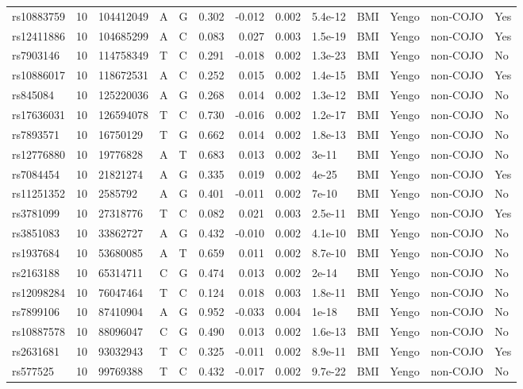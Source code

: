 \documentclass[11pt,twoside]{bristolthesis}
\begin{document}
\begin{longtable}[t]{lrlllrrrlllll}
rs10883759 & 10 & 104412049 & A & G & 0.302 & -0.012 & 0.002 & 5.4e-12 & BMI & Yengo & non-COJO & Yes\\
rs12411886 & 10 & 104685299 & A & C & 0.083 & 0.027 & 0.003 & 1.5e-19 & BMI & Yengo & non-COJO & Yes\\
rs7903146 & 10 & 114758349 & T & C & 0.291 & -0.018 & 0.002 & 1.3e-23 & BMI & Yengo & non-COJO & No\\
\addlinespace
rs10886017 & 10 & 118672531 & A & C & 0.252 & 0.015 & 0.002 & 1.4e-15 & BMI & Yengo & non-COJO & Yes\\
rs845084 & 10 & 125220036 & A & G & 0.268 & 0.014 & 0.002 & 1.3e-12 & BMI & Yengo & non-COJO & No\\
rs17636031 & 10 & 126594078 & T & C & 0.730 & -0.016 & 0.002 & 1.2e-17 & BMI & Yengo & non-COJO & No\\
rs7893571 & 10 & 16750129 & T & G & 0.662 & 0.014 & 0.002 & 1.8e-13 & BMI & Yengo & non-COJO & No\\
rs12776880 & 10 & 19776828 & A & T & 0.683 & 0.013 & 0.002 & 3e-11 & BMI & Yengo & non-COJO & No\\
\addlinespace
rs7084454 & 10 & 21821274 & A & G & 0.335 & 0.019 & 0.002 & 4e-25 & BMI & Yengo & non-COJO & Yes\\
rs11251352 & 10 & 2585792 & A & G & 0.401 & -0.011 & 0.002 & 7e-10 & BMI & Yengo & non-COJO & No\\
rs3781099 & 10 & 27318776 & T & C & 0.082 & 0.021 & 0.003 & 2.5e-11 & BMI & Yengo & non-COJO & Yes\\
rs3851083 & 10 & 33862727 & A & G & 0.432 & -0.010 & 0.002 & 4.1e-10 & BMI & Yengo & non-COJO & No\\
rs1937684 & 10 & 53680085 & A & T & 0.659 & 0.011 & 0.002 & 8.7e-10 & BMI & Yengo & non-COJO & No\\
\addlinespace
rs2163188 & 10 & 65314711 & C & G & 0.474 & 0.013 & 0.002 & 2e-14 & BMI & Yengo & non-COJO & No\\
rs12098284 & 10 & 76047464 & T & C & 0.124 & 0.018 & 0.003 & 1.8e-11 & BMI & Yengo & non-COJO & No\\
rs7899106 & 10 & 87410904 & A & G & 0.952 & -0.033 & 0.004 & 1e-18 & BMI & Yengo & non-COJO & No\\
rs10887578 & 10 & 88096047 & C & G & 0.490 & 0.013 & 0.002 & 1.6e-13 & BMI & Yengo & non-COJO & No\\
rs2631681 & 10 & 93032943 & T & C & 0.325 & -0.011 & 0.002 & 8.9e-11 & BMI & Yengo & non-COJO & Yes\\
\addlinespace
rs577525 & 10 & 99769388 & T & C & 0.432 & -0.017 & 0.002 & 9.7e-22 & BMI & Yengo & non-COJO & No\\

\end{longtable}
\end{document}
